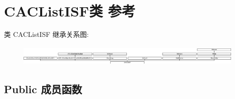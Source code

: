 \hypertarget{class_c_a_c_list_i_s_f}{}\section{C\+A\+C\+List\+I\+S\+F类 参考}
\label{class_c_a_c_list_i_s_f}
类 C\+A\+C\+List\+I\+SF 继承关系图\+:\begin{figure}[H]
\begin{center}
\leavevmode
\includegraphics[height=1.060606cm]{class_c_a_c_list_i_s_f}
\end{center}
\end{figure}
\subsection*{Public 成员函数}

